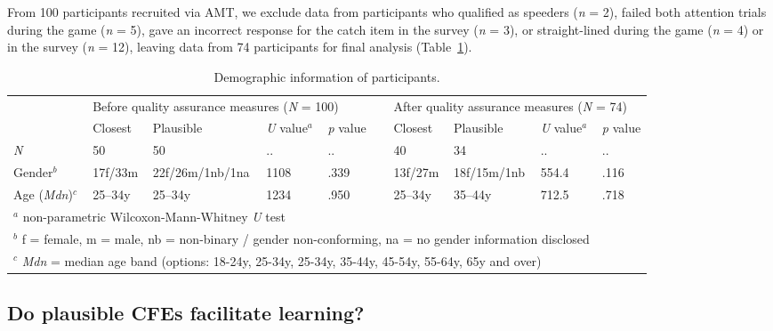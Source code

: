 From 100 participants recruited via \gls{AMT}, we exclude data from participants who qualified as speeders (\textit{n} = 2), failed both attention trials during the game (\textit{n} = 5), gave an incorrect response for the catch item in the survey (\textit{n} = 3), or straight-lined during the game (\textit{n} = 4) or in the survey (\textit{n} = 12), leaving data from 74 participants for final analysis (Table~\ref{tab:participants}).

\begin{table}
  \caption{Demographic information of participants.}
  \label{tab:participants}
\begin{tabular}{llllllllll} 
\toprule
    & \multicolumn{4}{l}{Before quality assurance measures (\textit{N} = 100)} && \multicolumn{4}{l}{After quality assurance measures (\textit{N} = 74)} \\
\cline{2-5}\cline{7-10}
    & Closest & Plausible & \textit{U} value$^a$ & \textit{p} value && Closest & Plausible & \textit{U} value$^a$ & \textit{p} value\\ 
\hline
\textit{N}   &  50 & 50 & .. & .. && 40 & 34 & .. & .. \\
Gender$^b$ & 17f/33m & 22f/26m/1nb/1na & 1108 & .339 && 13f/27m & 18f/15m/1nb & 554.4 & .116 \\
Age (\textit{Mdn})$^c$ & 25--34y & 25--34y & 1234 & .950 && 25--34y & 35--44y & 712.5 & .718 \\
\bottomrule
\multicolumn{9}{l}{$^a$ non-parametric Wilcoxon-Mann-Whitney \textit{U} test}\\
\multicolumn{9}{l}{$^b$ f = female, m = male, nb = non-binary / gender non-conforming, na = no gender information disclosed}\\
\multicolumn{9}{l}{$^c$ \textit{Mdn} = median age band (options: 18-24y, 25-34y, 25-34y, 35-44y, 45-54y, 55-64y, 65y and over)}
\end{tabular}
\end{table}

\subsection{Do plausible CFEs facilitate learning?}

